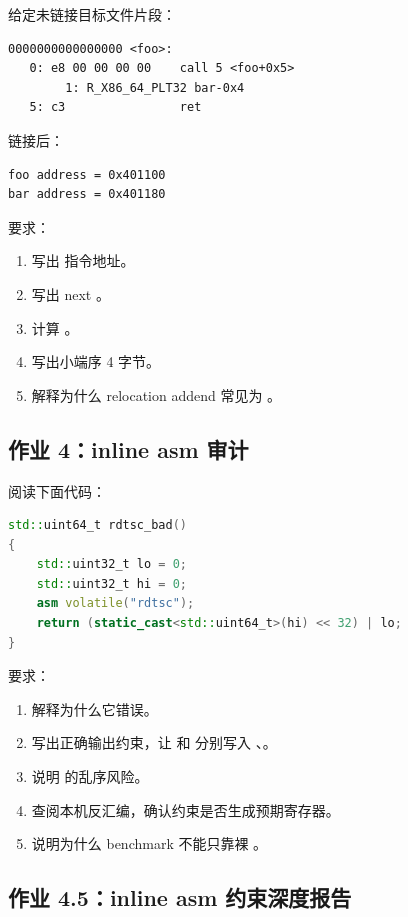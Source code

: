 \begin{exercisebox}
给定未链接目标文件片段：

\begin{lstlisting}
0000000000000000 <foo>:
   0: e8 00 00 00 00    call 5 <foo+0x5>
        1: R_X86_64_PLT32 bar-0x4
   5: c3                ret
\end{lstlisting}

链接后：

\begin{lstlisting}
foo address = 0x401100
bar address = 0x401180
\end{lstlisting}

要求：

\begin{enumerate}
  \item 写出  指令地址。
  \item 写出 next 。
  \item 计算 。
  \item 写出小端序 4 字节。
  \item 解释为什么 relocation addend 常见为 。
\end{enumerate}

\subsection*{作业 4：inline asm 审计}

阅读下面代码：

\begin{lstlisting}[language=C++]
std::uint64_t rdtsc_bad()
{
    std::uint32_t lo = 0;
    std::uint32_t hi = 0;
    asm volatile("rdtsc");
    return (static_cast<std::uint64_t>(hi) << 32) | lo;
}
\end{lstlisting}

要求：

\begin{enumerate}
  \item 解释为什么它错误。
  \item 写出正确输出约束，让  和  分别写入 、。
  \item 说明  的乱序风险。
  \item 查阅本机反汇编，确认约束是否生成预期寄存器。
  \item 说明为什么 benchmark 不能只靠裸 。
\end{enumerate}

\subsection*{作业 4.5：inline asm 约束深度报告}


\end{exercisebox}
